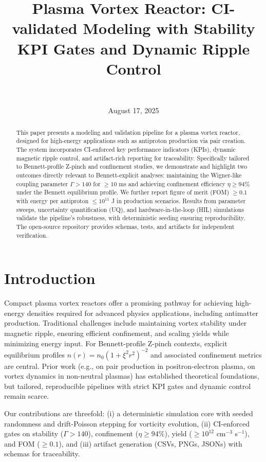 \documentclass[11pt]{article}
\title{Plasma Vortex Reactor: CI-validated Modeling with Stability KPI Gates and Dynamic Ripple Control}
\author{\authorname\\\texttt{\authoremail}}
\date{August 17, 2025}
\begin{document}
\maketitle
\begin{abstract}
This paper presents a modeling and validation pipeline for a plasma vortex reactor, designed for high-energy applications such as antiproton production via pair creation. The system incorporates CI-enforced key performance indicators (KPIs), dynamic magnetic ripple control, and artifact-rich reporting for traceability. Specifically tailored to Bennett-profile Z-pinch and confinement studies, we demonstrate and highlight two outcomes directly relevant to Bennett-explicit analyses: maintaining the Wigner-like coupling parameter $\Gamma > 140$ for $\geq 10$ ms and achieving confinement efficiency $\eta \geq 94\%$ under the Bennett equilibrium profile. We further report figure of merit (FOM) $\geq 0.1$ with energy per antiproton $\leq 10^{11}$ J in production scenarios. Results from parameter sweeps, uncertainty quantification (UQ), and hardware-in-the-loop (HIL) simulations validate the pipeline's robustness, with deterministic seeding ensuring reproducibility. The open-source repository provides schemas, tests, and artifacts for independent verification.
\end{abstract}
\section{Introduction}
Compact plasma vortex reactors offer a promising pathway for achieving high-energy densities required for advanced physics applications, including antimatter production. Traditional challenges include maintaining vortex stability under magnetic ripple, ensuring efficient confinement, and scaling yields while minimizing energy input. For Bennett-profile Z-pinch contexts, explicit equilibrium profiles $n(r)=n_0(1+\xi^2 r^2)^{-2}$ and associated confinement metrics are central. Prior work (e.g., \cite{arxiv2207.09093} on pair production in positron-electron plasma, \cite{arxiv2501.13940} on vortex dynamics in non-neutral plasmas) has established theoretical foundations, but tailored, reproducible pipelines with strict KPI gates and dynamic control remain scarce.

Our contributions are threefold: (i) a deterministic simulation core with seeded randomness and drift-Poisson stepping for vorticity evolution, (ii) CI-enforced gates on stability ($\Gamma > 140$), confinement ($\eta \geq 94\%$), yield ($\geq 10^{12}$ cm$^{-3}$ s$^{-1}$), and FOM ($\geq 0.1$), and (iii) artifact generation (CSVs, PNGs, JSONs) with schemas for traceability. 
\end{document}
